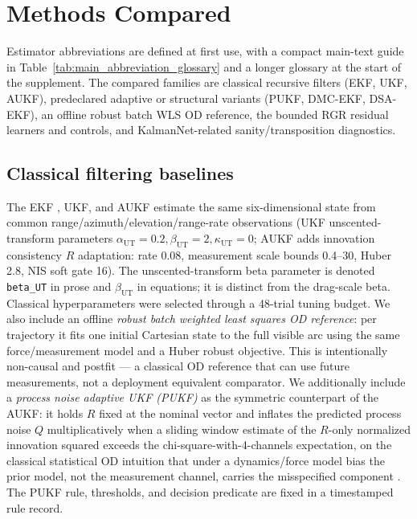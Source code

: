 \documentclass{article}
\begin{document}
\section{Methods Compared}
Estimator abbreviations are defined at first use, with a compact main-text guide in Table~\ref{tab:main_abbreviation_glossary} and a longer glossary at the start of the supplement. The compared families are classical recursive filters (EKF, UKF, AUKF), predeclared adaptive or structural variants (PUKF, DMC-EKF, DSA-EKF), an offline robust batch WLS OD reference, the bounded RGR residual learners and controls, and KalmanNet-related sanity/transposition diagnostics.

\subsection{Classical filtering baselines}
The EKF \cite{jazwinski1970stochastic}, UKF, and AUKF estimate the same six-dimensional state from common range/azimuth/elevation/range-rate observations (UKF unscented-transform parameters $\alpha_{\mathrm{UT}}=0.2,\beta_{\mathrm{UT}}=2,\kappa_{\mathrm{UT}}=0$; AUKF adds innovation consistency $R$ adaptation: rate 0.08, measurement scale bounds 0.4--30, Huber 2.8, NIS soft gate 16). The unscented-transform beta parameter is denoted \texttt{beta\_UT} in prose and \(\beta_{\mathrm{UT}}\) in equations; it is distinct from the drag-scale beta. Classical hyperparameters were selected through a 48-trial tuning budget. We also include an offline \emph{robust batch weighted least squares OD reference}: per trajectory it fits one initial Cartesian state to the full visible arc using the same force/measurement model and a Huber robust objective. This is intentionally non-causal and postfit --- a classical OD reference that can use future measurements, not a deployment equivalent comparator. We additionally include a \emph{process noise adaptive UKF (PUKF)} as the symmetric counterpart of the AUKF: it holds $R$ fixed at the nominal vector and inflates the predicted process noise $Q$ multiplicatively when a sliding window estimate of the $R$-only normalized innovation squared exceeds the chi-square-with-4-channels expectation, on the classical statistical OD intuition that under a dynamics/force model bias the prior model, not the measurement channel, carries the misspecified component \cite{mehra1970adaptive,jazwinski1970stochastic,stacey2021adaptive}. The PUKF rule, thresholds, and decision predicate are fixed in a timestamped rule record.
\end{document}
